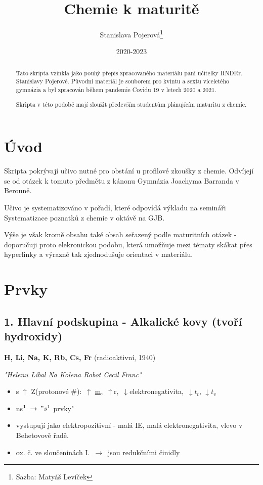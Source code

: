 \documentclass{article}
\title{Chemie k maturitě}
\author{Stanislava Pojerová\thanks{Sazba: Matyáš Levíček}}
\date{2020-2023}
\def\SP#1{\textsuperscript{#1}}
\begin{document}
    \maketitle

    \begin{abstract}
        Tato skripta vzinkla jako pouhý přepis zpracovaného materiálu paní učitelky RNDRr. Stanislavy Pojerové. Původní materiál je souborem pro kvintu a sextu víceletého gymnázia a byl zpracován během pandemie Covidu 19 v letech 2020 a 2021.
        
        Skripta v této podobě mají sloužit především studentům plánujícím maturitu z chemie. 
    \end{abstract}

    \newpage
    \tableofcontents
    \newpage
    
    \section{Úvod}
        Skripta pokrývají učivo nutné pro obstání u profilové zkoušky z chemie. Odvíjejí se od otázek k tomuto předmětu z kánonu Gymnázia Joachyma Barranda v Berouně.

        Učivo je systematizováno v pořadí, které odpovídá výkladu na semináři Systematizace poznatků z chemie v oktávě na GJB. 

        Výše je však kromě obsahu také obsah seřazený podle maturitních otázek - doporučuji proto elekronickou podobu, která umožňuje mezi tématy skákat přes hyperlinky a výrazně tak zjednodušuje orientaci v materiálu.
    \newpage

\section{Prvky}
\subsection{1. Hlavní podskupina - Alkalické kovy (tvoří hydroxidy)}
\setlength{\parindent}{0px}
\textbf{H, Li, Na, K, Rb, Cs, Fr} (radioaktivní, 1940)

\textit{"Helenu Líbal Na Kolena Robot Cecil Franc"}
    \begin{itemize}
        \item s $\uparrow$ Z(protonové \#): $\, \uparrow$ \underline{m}, $\, \uparrow$r, $\, \downarrow$elektronegativita, $\, \downarrow t_t, \, \downarrow t_v$
        \item ns$\SP{1}$ \fbox{$\downarrow$} $\,\to\, "s\SP{1}$ prvky"
        
        \item vystupují jako elektropozitivní - malá IE, malá elektronegativita, vlevo v Behetovově řadě.
        \item ox. č. ve sloučeninách I. $\,\to\,$ jsou redukčními činidly
    \end{itemize}
\end{document}
